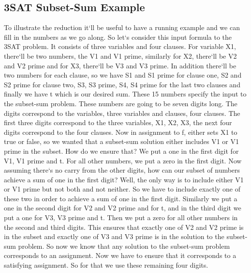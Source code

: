 \subsection{3SAT Subset-Sum  Example}
To illustrate the reduction it`ll be useful to have a running example and we can fill in the numbers as we go along.
So let`s consider this input formula to the 3SAT problem.
It consists of three variables and four clauses.
For variable X1, there`ll be two numbers, the V1 and V1 prime, similarly for X2, there`ll be V2 and V2 prime and for X3, there`ll be V3 and V3 prime.
In addition there`ll be two numbers for each clause, so we have S1 and S1 prime for clause one, S2 and S2 prime for clause two, S3, S3 prime, S4, S4 prime for the last two clauses and finally we have t which is our desired sum.
These 15 numbers specify the input to the subset-sum problem.
These numbers are going to be seven digits long.
The digits correspond to the variables, three variables and clauses, four clauses.
The first three digits correspond to the three variables, X1, X2, X3, the next four digits correspond to the four clauses.
Now in assignment to f, either sets X1 to true or false, so we wanted that a subset-sum solution either includes V1 or V1 prime in the subset.
How do we ensure that? We put a one in the first digit for V1, V1 prime and t.
For all other numbers, we put a zero in the first digit.
Now assuming there`s no carry from the other digits, how can our subset of numbers achieve a sum of one in the first digit? Well, the only way is to include either V1 or V1 prime but not both and not neither.
So we have to include exactly one of these two in order to achieve a sum of one in the first digit.
Similarly we put a one in the second digit for V2 and V2 prime and for t, and in the third digit we put a one for V3, V3 prime and t.
Then we put a zero for all other numbers in the second and third digits.
This ensures that exactly one of V2 and V2 prime is in the subset and exactly one of V3 and V3 prime is in the solution to the subset-sum problem.
So now we know that any solution to the subset-sum problem corresponds to an assignment.
Now we have to ensure that it corresponds to a satisfying assignment.
So for that we use these remaining four digits.

